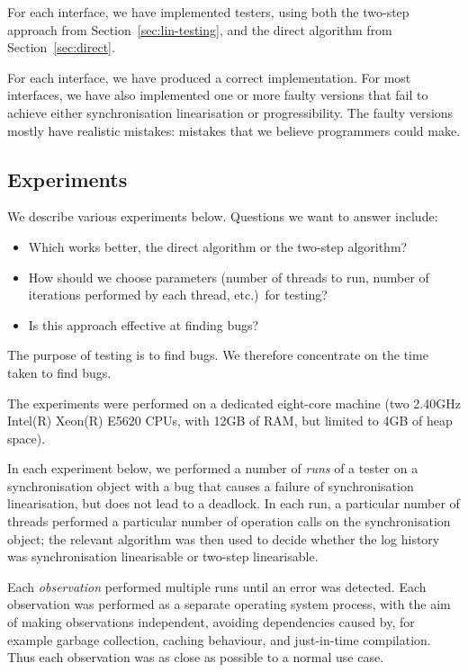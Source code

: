 For each interface, we have implemented testers, using both the two-step
approach from Section~\ref{sec:lin-testing}, and the direct algorithm from
Section~\ref{sec:direct}.

For each interface, we have produced a correct implementation.  For most
interfaces, we have also implemented one or more faulty versions that fail to
achieve either synchronisation linearisation or progressibility.  The faulty
versions mostly have realistic mistakes: mistakes that we believe programmers
could make.


\subsection{Experiments}


We describe various experiments below.  Questions we want to answer include:
\begin{itemize}
\item Which works better, the direct algorithm or the two-step algorithm?  
\item How should we choose parameters (number of threads to run, number of
  iterations performed by each thread, etc.)\ for testing?  
\item Is this approach effective at finding bugs?
\end{itemize}
%
The purpose of testing is to find bugs.  We therefore concentrate on the time
taken to find bugs.


The experiments were performed on a dedicated eight-core machine (two 2.40GHz
Intel(R) Xeon(R) E5620 CPUs, with 12GB of RAM, but limited to 4GB of heap
space).

In each experiment below, we performed a number of \emph{runs} of a tester on
a synchronisation object with a bug that causes a failure
of synchronisation linearisation, but does not lead to a deadlock.  In each
run, a particular number of threads performed a particular number of operation
calls on the synchronisation object; the relevant algorithm was then used to
decide whether the log history was synchronisation linearisable or two-step
linearisable.

Each \emph{observation} performed multiple runs until an error was detected.
Each observation was performed as a separate operating system process, with
the aim of making observations independent, avoiding dependencies caused by,
for example garbage collection, caching behaviour, and just-in-time
compilation.  Thus each observation was as close as possible to a normal use
case.

